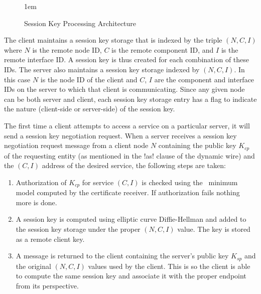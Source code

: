 \begin{figure}[htbp]
  
  \centerline{\raise 1em\box\graph}
  \caption{Session Key Processing Architecture}
  \label{figure-sessionkey-daemon}
\end{figure}

The client maintains a session key storage that is indexed by the triple $(N, C, I)$ where $N$
is the remote node ID, $C$ is the remote component ID, and $I$ is the remote interface ID. A
session key is thus created for each combination of these IDs. The server also maintains a
session key storage indexed by $(N, C, I)$. In this case $N$ is the node ID of the client and
$C$, $I$ are the component and interface IDs on the server to which that client is
communicating. Since any given node can be both server and client, each session key storage
entry has a flag to indicate the nature (client-side or server-side) of the session key.

%

The first time a client attempts to access a service on a particular server, it will send a
session key negotiation request. When a server receives a session key negotiation request
message from a client node $N$ containing the public key $K_{cp}$ of the requesting entity (as
mentioned in the !as! clause of the dynamic wire) and the $(C, I)$ address of the desired
service, the following steps are taken:
\begin{enumerate}
\item Authorization of $K_{cp}$ for service $(C, I)$ is checked using the \RT\ minimum model
  computed by the certificate receiver. If authorization fails nothing more is done.
\item A session key is computed using elliptic curve Diffie-Hellman and added to the session key
  storage under the proper $(N, C, I)$ value. The key is stored as a remote client key.
\item A message is returned to the client containing the server's public key $K_{sp}$ and the
  original $(N, C, I)$ values used by the client. This is so the client is able to compute the
  same session key and associate it with the proper endpoint from its perspective.
\end{enumerate}

